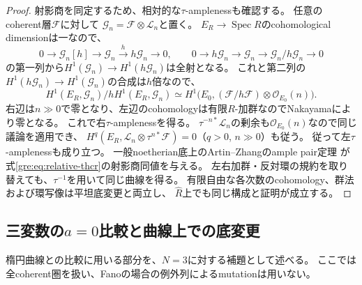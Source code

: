\begin{proof}
射影商を同定するため、相対的な$\tau$-amplenessも確認する。
任意のcoherent層$\mathcal F$に対して
$\mathcal G_n=\mathcal F\otimes\mathcal L_n$と置く。
$E_R\to\operatorname{Spec}R$のcohomological dimensionは一なので、
\[
 0\to\mathcal G_n[h]\to\mathcal G_n\xrightarrow{h}h\mathcal G_n\to0,
 \qquad
 0\to h\mathcal G_n\to\mathcal G_n\to\mathcal G_n/h\mathcal G_n\to0
\]
の第一列から$H^1(\mathcal G_n)\to H^1(h\mathcal G_n)$は全射となる。
これと第二列の$H^1(h\mathcal G_n)\to H^1(\mathcal G_n)$の合成は$h$倍なので、
\begin{equation}\label{gre:eq:relative-ampleness}
 H^1(E_R,\mathcal G_n)/hH^1(E_R,\mathcal G_n)
 \simeq H^1\bigl(E_0,(\mathcal F/h\mathcal F)\otimes\mathcal O_{E_0}(n)\bigr).
\end{equation}
右辺は$n\gg0$で零となり、左辺のcohomologyは有限$R$-加群なのでNakayamaにより零となる。
これで右$\tau$-amplenessを得る。
$\tau^{-n*}\mathcal L_n$の剰余も$\mathcal O_{E_0}(n)$なので同じ議論を適用でき、
$H^q(E_R,\mathcal L_n\otimes\tau^{n*}\mathcal F)=0$（$q>0$, $n\gg0$）も従う。
従って左$\tau$-amplenessも成り立つ。
一般noetherian底上のArtin--Zhangのample pair定理
\cite[Theorem~4.5]{LP-AZ}\cite[Proposition~7.2, Lemma~7.6]{GRKeeler}が
式\eqref{gre:eq:relative-thcr}の射影商同値を与える。
左右加群・反対環の規約を取り替えても、$\tau^{-1}$を用いて同じ曲線を得る。
有限自由な各次数のcohomology、群法および環写像は平坦底変更と両立し、
$\widehat R$上でも同じ構成と証明が成立する。
\end{proof}

\subsection{三変数の$a=0$比較と曲線上での底変更}
楕円曲線との比較に用いる部分を、$N=3$に対する補題として述べる。
ここでは全coherent圏を扱い、Fanoの場合の例外列によるmutationは用いない。

